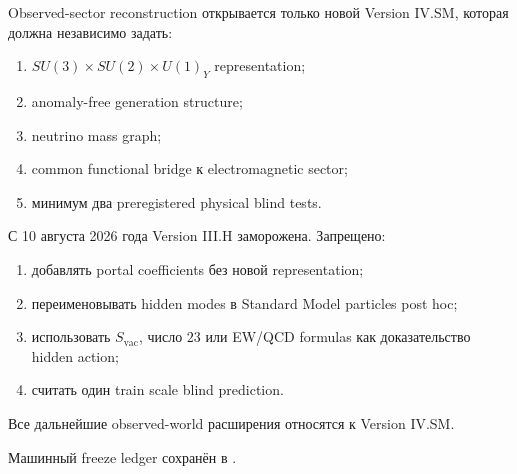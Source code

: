 Observed-sector reconstruction открывается только новой Version IV.SM,
которая должна независимо задать:
\begin{enumerate}
 \item \(SU(3)\times SU(2)\times U(1)_Y\) representation;
 \item anomaly-free generation structure;
 \item neutrino mass graph;
 \item common functional bridge к electromagnetic sector;
 \item минимум два preregistered physical blind tests.
\end{enumerate}

\begin{protocol}
С 10 августа 2026 года Version III.H заморожена. Запрещено:
\begin{enumerate}
 \item добавлять portal coefficients без новой representation;
 \item переименовывать hidden modes в Standard Model particles post hoc;
 \item использовать \(S_{\mathrm{vac}}\), число \(23\) или EW/QCD formulas
 как доказательство hidden action;
 \item считать один train scale blind prediction.
\end{enumerate}
Все дальнейшие observed-world расширения относятся к Version IV.SM.
\end{protocol}

Машинный freeze ledger сохранён в
.